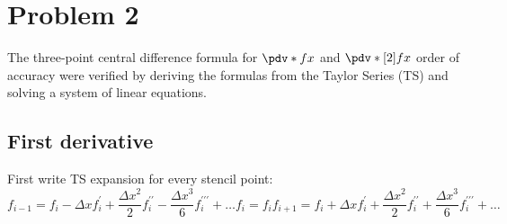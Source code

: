 \newcommand{\fii}{f_{i}}
\newcommand{\fipone}{f_{i+1}}
\newcommand{\fiptwo}{f_{i+2}}
\newcommand{\fimone}{f_{i-1}}
\newcommand{\fimtwo}{f_{i-2}}
\newcommand{\Dx}[1]{{\Delta x}^{#1}}
\newcommand{\ac}[1]{a_{#1}}
\newcommand{\Order}[1]{$O\left( #1 \right)$}


\section{Problem 2}

The three-point central difference formula for $\pdv*{f}{x}$ and $\pdv*[2]{f}{x}$ order of accuracy were
verified by deriving the formulas from the Taylor Series (TS) and solving a system of linear
equations.

\subsection{First derivative}

First write TS expansion for every stencil point:
\begin{subequations}
    \begin{equation}
        \fimone = \fii - \Delta x \fii ^{ \prime } + \frac{ \Dx{2} }{ 2 } \fii^{ \prime \prime }- \frac{ \Dx{3}  }{ 6 } \fii^{ \prime \prime \prime }+ \ldots
    \end{equation}
    \begin{equation}
        \fii = \fii
    \end{equation}
    \begin{equation}
        \fipone = \fii + \Delta x \fii ^{ \prime } + \frac{ \Dx{2} }{ 2 } \fii ^{ \prime \prime } + \frac{ \Dx{3}  }{ 6 } \fii^{ \prime \prime \prime } + \ldots
    \end{equation}
    \label{eq:PS-2a-TS}
\end{subequations}


